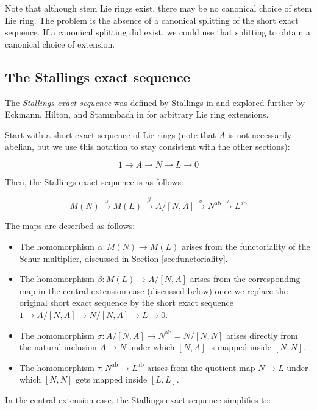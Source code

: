 Note that although stem Lie rings exist, there may be no canonical choice
of stem Lie ring. The problem is the absence of a canonical splitting of
the short exact sequence. If a canonical splitting did exist, we could
use that splitting to obtain a canonical choice of extension.

\subsection{The Stallings exact sequence}

The {\em Stallings exact sequence} was defined by Stallings in
\cite{Stallings} and explored further by Eckmann, Hilton, and
Stammbach in \cite{EckmannHiltonStammbach} for arbitrary Lie ring
extensions.

Start with a short exact sequence of Lie rings (note that $A$ is not
necessarily abelian, but we use this notation to stay consistent with
the other sections):

$$1 \to A \to N \to L \to 0$$

Then, the Stallings exact sequence is as follows:

$$M(N) \stackrel{\alpha}{\to} M(L) \stackrel{\beta}{\to} A/[N,A] \stackrel{\sigma}{\to} N^{\operatorname{ab}} \stackrel{\tau}{\to} L^{\operatorname{ab}}$$

The maps are described as follows:

\begin{itemize}
\item The homomorphism $\alpha:M(N) \to M(L)$ arises from the
  functoriality of the Schur multiplier, discussed in Section
  \ref{sec:functoriality}.
\item The homomorphism $\beta:M(L) \to A/[N,A]$ arises from the
  corresponding map in the central extension case (discussed below)
  once we replace the original short exact sequence by the short exact
  sequence $1 \to A/[N,A] \to N/[N,A] \to L \to 0$.
\item The homomorphism $\sigma:A/[N,A] \to N^{\operatorname{ab}} =
  N/[N,N]$ arises directly from the natural inclusion $A \to N$ under
  which $[N,A]$ is mapped inside $[N,N]$.
\item The homomorphism $\tau:N^{\operatorname{ab}} \to
  L^{\operatorname{ab}}$ arises from the quotient map $N \to L$ under
  which $[N,N]$ gets mapped inside $[L,L]$.
\end{itemize}

In the central extension case, the Stallings exact sequence simplifies to:

